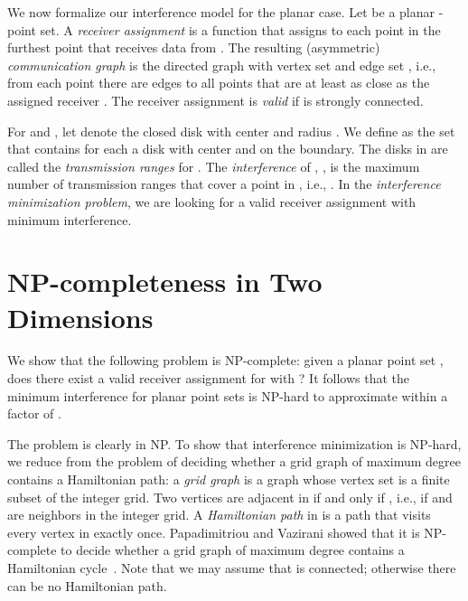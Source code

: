 \documentclass[envcountsect,envcountsame,runningheads,a4paper]{llncs}
\begin{document}
We now formalize our interference model for the
planar case.
Let  be a planar -point set.
A \emph{receiver assignment} 
is a function that assigns to each point in  the furthest
point that receives data from .
The resulting (asymmetric) \emph{communication graph}
 is the directed graph
with vertex set  and edge set
,
i.e., from each point  there are edges
to all points that are at least as close as the
assigned receiver .
The receiver assignment  is \emph{valid}
if  is strongly connected.

For  and , let  denote
the closed disk with center  and radius .
We define  as the
set that contains for each 
a disk with center  and  on the boundary.
The disks in  are called the \emph{transmission
ranges} for .
The \emph{interference}
of , , is the maximum number of transmission ranges
that cover a point in , i.e.,
.
In the \emph{interference minimization problem}, we are looking for
a valid receiver assignment with minimum interference.

\section{NP-completeness in Two Dimensions}

We show that the following problem is
NP-complete: given a planar point set
, does there exist a valid receiver assignment
 for  with ?
It follows that the minimum interference for
planar point sets is
NP-hard to approximate within a
factor of .

The problem is clearly in NP.
To show that interference minimization is NP-hard,
we reduce from the problem of deciding
whether a grid graph of maximum degree  contains
a Hamiltonian path:
a \emph{grid graph}  is a graph whose vertex
set  is a finite
subset of the integer grid.
Two vertices  are adjacent in 
if and only if , i.e., if  and 
are neighbors in the integer grid.
A \emph{Hamiltonian path} in  is a path
that visits every vertex in  exactly once.
Papadimitriou and Vazirani showed that
it is NP-complete to decide whether a grid graph 
of maximum degree  contains a Hamiltonian
cycle~\cite{PapadimitriouVa84}.
Note that we may assume that 
is connected;
otherwise there can be no Hamiltonian path.
\end{document}
